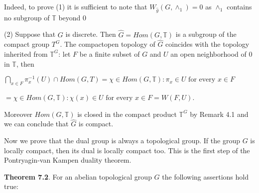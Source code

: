 \documentclass[12pt]{article}
\begin{document}
    Indeed, to prove (1) it is sufficient to note that $W_{\hat{g}}(G,\wedge_1) = {0}$ as $\wedge_1$ contains no subgroup of $\mathbb{T}$ beyond 0


    (2) Suppose that $G$ is discrete. Then $\hat{G} = Hom(G,\mathbb{T})$ is a subgroup of the compact group $T^G$. The 
compactopen topology of $\hat{G}$ coincides with the topology inherited from $\mathbb{T}^G$: let $F$ be a finite subset of $G$ and $U$ an open
neighborhood of 0 in $\mathbb{T}$, then


    $\bigcap_{x \in F} π^{-1}_x (U) \cap Hom (G,T) = {\chi \in Hom(G,\mathbb{T}) : \pi_x \in U \text{ for every } x \in F}$


        $= {\chi \in Hom (G,\mathbb{T}) : \chi(x) \in U \text{ for every } x \in F} = W(F, U)$.


    Moreover $Hom (G,\mathbb{T})$ is closed in the compact product $\mathbb{T}^G$ by Remark 4.1 and we can conclude that $\hat{G}$ is
compact.


    Now we prove that the dual group is always a topological group. If the group $G$ is locally compact, then its
dual is locally compact too. This is the first step of the Pontryagin-van Kampen duality theorem.


\textbf{Theorem 7.2}. For an abelian topological group $G$ the following assertions hold true:
\end{document}

